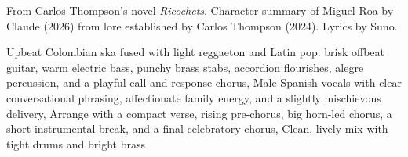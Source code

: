 
\begin{notes}
From Carlos Thompson's novel \emph{Ricochets}. Character summary of Miguel Roa by Claude (2026) from lore established by Carlos Thompson (2024). Lyrics by Suno.
\end{notes}
\begin{style}
Upbeat Colombian ska fused with light reggaeton and Latin pop: brisk offbeat guitar, warm electric bass, punchy brass stabs, accordion flourishes, alegre percussion, and a playful call-and-response chorus, Male Spanish vocals with clear conversational phrasing, affectionate family energy, and a slightly mischievous delivery, Arrange with a compact verse, rising pre-chorus, big horn-led chorus, a short instrumental break, and a final celebratory chorus, Clean, lively mix with tight drums and bright brass
\end{style}
